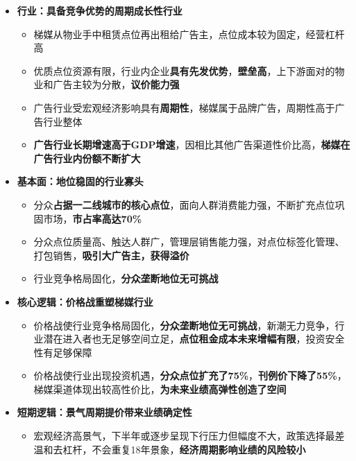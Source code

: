   \begin{itemize}[leftmargin=*]
    \item
      \textbf{行业：具备竞争优势的周期成长性行业}
      {\small
      \begin{itemize}
        \item 梯媒从物业手中租赁点位再出租给广告主，点位成本较为固定，经营杠杆高
        \item 优质点位资源有限，行业内企业\textbf{具有先发优势}，\textbf{壁垒高}，上下游面对的物业和广告主较为分散，\textbf{议价能力强}
        \item 广告行业受宏观经济影响具有\textbf{周期性}，梯媒属于品牌广告，周期性高于广告行业整体
        \item\textbf{ 广告行业长期增速高于GDP增速}，因相比其他广告渠道性价比高，\textbf{梯媒在广告行业内份额不断扩大}
      \end{itemize}
      }
    \item
      \textbf{基本面：地位稳固的行业寡头}
      {\small
      \begin{itemize}
        \item 分众\textbf{占据一二线城市的核心点位}，面向人群消费能力强，不断扩充点位巩固市场，\textbf{市占率高达70\%}
        \item 分众点位质量高、触达人群广，管理层销售能力强，对点位标签化管理、打包销售，\textbf{吸引大广告主，获得溢价}
        \item 行业竞争格局固化，\textbf{分众垄断地位无可挑战}
      \end{itemize}
      }
      \item
      \textbf{核心逻辑：价格战重塑梯媒行业}
      {\small
      \begin{itemize}
        \item 价格战使行业竞争格局固化，\textbf{分众垄断地位无可挑战}，新潮无力竞争，行业潜在进入者也无足够空间立足，\textbf{点位租金成本未来增幅有限}，投资安全性有足够保障
        \item 价格战使行业出现投资机遇，\textbf{分众点位扩充了75\%}，\textbf{刊例价下降了55\%}，梯媒渠道体现出较高性价比，\textbf{为未来业绩高弹性创造了空间}
      \end{itemize}
      }
    \item
      \textbf{短期逻辑：景气周期提价带来业绩确定性}
      {\small
      \begin{itemize}
        \item 宏观经济高景气，下半年或逐步呈现下行压力但幅度不大，政策选择最差温和去杠杆，不会重复18年景象，\textbf{经济周期影响业绩的风险较小}

\end{itemize}}
\end{itemize}

